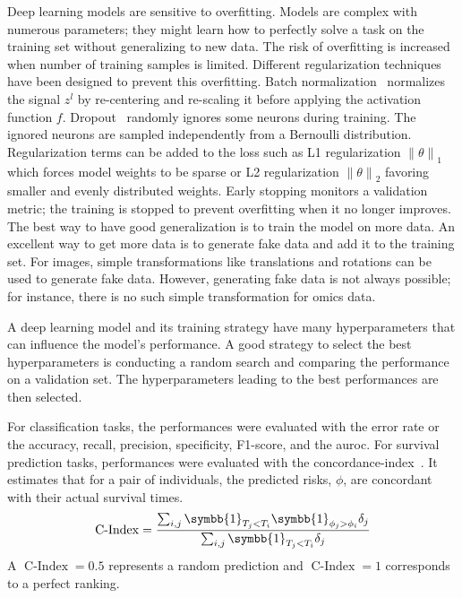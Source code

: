 \documentclass[../main.tex]{subfiles}
\begin{document}
		Deep learning models are sensitive to overfitting.
		Models are complex with numerous parameters; they might learn how to perfectly solve a task on the training set without generalizing to new data.
		The risk of overfitting is increased when number of training samples is limited.
		Different regularization techniques have been designed to prevent this overfitting.
		Batch normalization~\cite{BatchNorm} normalizes the signal \(z^{l}\) by re-centering and re-scaling it before applying the activation function \(f\).
		Dropout~\cite{Dropout} randomly ignores some neurons during training.
		The ignored neurons are sampled independently from a Bernoulli distribution.
		Regularization terms can be added to the loss such as L1 regularization \({\|\theta\|}_{1}\) which forces model weights to be sparse or L2 regularization \({\|\theta\|}_{2}\) favoring smaller and evenly distributed weights.
		Early stopping monitors a validation metric; the training is stopped to prevent overfitting when it no longer improves.
		The best way to have good generalization is to train the model on more data.
		An excellent way to get more data is to generate fake data and add it to the training set.
		For images, simple transformations like translations and rotations can be used to generate fake data.
		However, generating fake data is not always possible; for instance, there is no such simple transformation for omics data.

		A deep learning model and its training strategy have many hyperparameters that can influence the model's performance.
		A good strategy to select the best hyperparameters is conducting a random search and comparing the performance on a validation set.
		The hyperparameters leading to the best performances are then selected.

		For classification tasks, the performances were evaluated with the error rate or the accuracy, recall, precision, specificity, F1-score, and the \gls{auroc}.
		For survival prediction tasks, performances were evaluated with the concordance-index~\cite{Harrell1982}.
		It estimates that for a pair of individuals, the predicted risks, \(\phi\),  are concordant with their actual survival times.
		\begin{equation}
			\operatorname{C-Index} = \frac{\sum_{i,j}\symbb{1}_{T_j < T_i}\symbb{1}_{\phi_j > \phi_i}\delta_j}{\sum_{i,j}\symbb{1}_{T_j < T_i}\delta_j}
		\end{equation}
		A \(\operatorname{C-Index} = 0.5\) represents a random prediction and \(\operatorname{C-Index} = 1\) corresponds to a perfect ranking.
\end{document}
